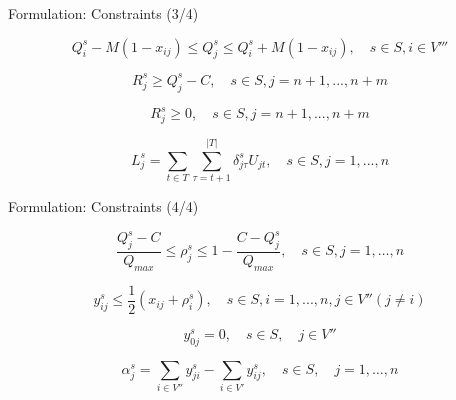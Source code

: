 \documentclass{beamer} %
\theoremstyle{definition} %
\begin{document}
	

\begin{frame}{Formulation: Constraints (3/4)}
	\begin{block}{}
		\begin{equation}\label{c9}
			Q_i^s -M(1-x_{ij}) \leq	Q_j^s \leq Q_i^s + M(1-x_{ij}), \quad s \in S, i\in V''' 
		\end{equation}
		
		\begin{equation}\label{c10}
			R_j^s\geq Q_j^s - C , \quad s \in S, j=n+1,...,n+m 
		\end{equation}
		
		\begin{equation}\label{c11}
			R_j^s\geq 0, \quad s \in S, j=n+1,...,n+m 
		\end{equation}
		
		\begin{equation}\label{c12}
			L_j^s=\sum_{t\in T}\sum_{\tau=t+1}^{|T|}\delta_{j\tau}^sU_{jt}, \quad s \in S, j=1,...,n 
		\end{equation}

	\end{block}
\end{frame}

\begin{frame}{Formulation: Constraints (4/4)}
	\begin{block}{}
			
			\begin{equation}\label{c14}
			\frac{Q_j^s-C}{Q_{max}}	\leq \rho_j^s \leq 1-\frac{C-Q_j^s}{Q_{max}}, \quad s \in S, j = 1, \ldots ,n 
			\end{equation}
			
			\begin{equation}\label{c15}
				y_{ij}^s \leq \frac{1}{2}(x_{ij}+\rho_i^s), \quad s \in 	S, i=1,...,n, j \in V'' (j \neq i)
			\end{equation}
		
			\begin{equation} \label{cy}
				y_{0j}^s = 0, \quad s \in S, \quad j \in V''
			\end{equation}
		
		\begin{equation} \label{cyalpha}
			\alpha_j^s = \sum_{i \in V''}y_{ji}^s - \sum_{i \in V'}y_{ij}^s, \quad s \in S, \quad j = 1, \ldots, n
		\end{equation}
	\end{block}
\end{frame}
\end{document}
